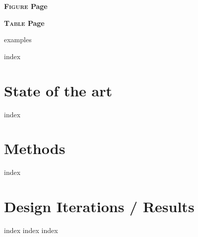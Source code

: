 \documentclass[a4paper,12pt,leqno,openbib]{memoir} %
\begin{document}
\frontmatter
{}



 \utsclearemptydoublepage
 \utsclearemptydoublepage
 \utsclearemptydoublepage
 \utsclearemptydoublepage
 \utsclearemptydoublepage

\renewcommand{\contentsname}{Table of Contents}
\tableofcontents*
\printglossary[type=\acronymtype, title=Abbreviations, toctitle=Abbreviations]
\utsclearemptydoublepage

\listoffigures
{}
{\par\nobreak\textbf{{\scshape Figure} \hfill Page}\par\nobreak}
\utsclearemptydoublepage

\listoftables
{}
{\par\nobreak\textbf{{\scshape Table} \hfill Page}\par\nobreak}
\utsclearemptydoublepage



{examples} \utsclearemptydoublepage


\mainmatter
{index} \utsclearemptydoublepage

\part{State of the art}
{index} \utsclearemptydoublepage

\part{Methods}
{index} \utsclearemptydoublepage

\part{Design Iterations / Results}
{index} \utsclearemptydoublepage
{index} \utsclearemptydoublepage
{index} \utsclearemptydoublepage
\end{document}
